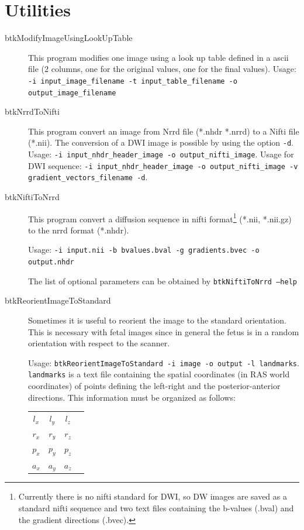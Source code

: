 \section{Utilities}


\begin{description}

\item[btkModifyImageUsingLookUpTable] This program modifies one image using a
look up table defined in a ascii file (2 columns, one for the original values,
one for the final values). Usage: \texttt{-i input\_image\_filename -t
input\_table\_filename -o output\_image\_filename}
  

\item[btkNrrdToNifti] This program convert an image from Nrrd file (*.nhdr
*.nrrd) to a Nifti file (*.nii). The conversion of a DWI image is possible by
using the option \texttt{-d}. Usage: \texttt{-i input\_nhdr\_header\_image -o
output\_nifti\_image}. Usage for DWI sequence: \texttt{-i
input\_nhdr\_header\_image -o output\_nifti\_image -v
gradient\_vectors\_filename -d}.

\item[btkNiftiToNrrd] This program convert a diffusion sequence in nifti
format\footnote{Currently there is no nifti standard for DWI, so DW images are
saved as a standard nifti sequence and two text files containing the b-values
(.bval) and the gradient directions (.bvec).} (*.nii, *.nii.gz) to the nrrd
format (*.nhdr). 

Usage: \texttt{-i input.nii -b bvalues.bval -g gradients.bvec -o output.nhdr
}

The list of optional parameters can be obtained by \texttt{btkNiftiToNrrd
--help}

  
  \item[btkReorientImageToStandard] Sometimes it is useful
to reorient the image to the standard orientation. This is necessary with fetal
images since in general the fetus is in a random orientation with respect to the
scanner.

Usage: \texttt{btkReorientImageToStandard -i image -o output -l landmarks}.
\texttt{landmarks} is a text file containing the spatial coordinates (in
RAS world coordinates) of points defining the left-right and the
posterior-anterior directions. This information must be organized as follows:

\begin{tabular}{cccc}
$l_x$ & $l_y$ & $l_z$ \\
$r_x$ & $r_y$ & $r_z$ \\
$p_x$ & $p_y$ & $p_z$ \\
$a_x$ & $a_y$ & $a_z$ 
\end{tabular}


\end{description}

